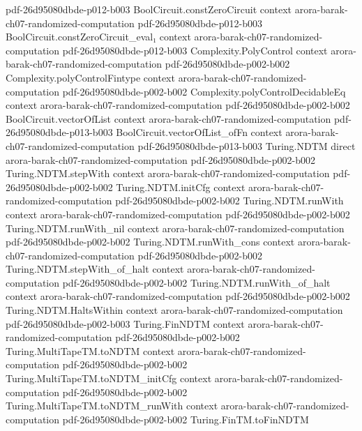 \begin{theorem}
  {pdf-26d95080dbde-p012-b003}
\proofstep
  {BoolCircuit.constZeroCircuit}
  {context}
  {arora-barak-ch07-randomized-computation}
  {pdf-26d95080dbde-p012-b003}
\proofstep
  {BoolCircuit.constZeroCircuit_eval₁}
  {context}
  {arora-barak-ch07-randomized-computation}
  {pdf-26d95080dbde-p012-b003}
\proofstep
  {Complexity.PolyControl}
  {context}
  {arora-barak-ch07-randomized-computation}
  {pdf-26d95080dbde-p002-b002}
\proofstep
  {Complexity.polyControlFintype}
  {context}
  {arora-barak-ch07-randomized-computation}
  {pdf-26d95080dbde-p002-b002}
\proofstep
  {Complexity.polyControlDecidableEq}
  {context}
  {arora-barak-ch07-randomized-computation}
  {pdf-26d95080dbde-p002-b002}
\proofstep
  {BoolCircuit.vectorOfList}
  {context}
  {arora-barak-ch07-randomized-computation}
  {pdf-26d95080dbde-p013-b003}
\proofstep
  {BoolCircuit.vectorOfList_ofFn}
  {context}
  {arora-barak-ch07-randomized-computation}
  {pdf-26d95080dbde-p013-b003}
\proofstep
  {Turing.NDTM}
  {direct}
  {arora-barak-ch07-randomized-computation}
  {pdf-26d95080dbde-p002-b002}
\proofstep
  {Turing.NDTM.stepWith}
  {context}
  {arora-barak-ch07-randomized-computation}
  {pdf-26d95080dbde-p002-b002}
\proofstep
  {Turing.NDTM.initCfg}
  {context}
  {arora-barak-ch07-randomized-computation}
  {pdf-26d95080dbde-p002-b002}
\proofstep
  {Turing.NDTM.runWith}
  {context}
  {arora-barak-ch07-randomized-computation}
  {pdf-26d95080dbde-p002-b002}
\proofstep
  {Turing.NDTM.runWith_nil}
  {context}
  {arora-barak-ch07-randomized-computation}
  {pdf-26d95080dbde-p002-b002}
\proofstep
  {Turing.NDTM.runWith_cons}
  {context}
  {arora-barak-ch07-randomized-computation}
  {pdf-26d95080dbde-p002-b002}
\proofstep
  {Turing.NDTM.stepWith_of_halt}
  {context}
  {arora-barak-ch07-randomized-computation}
  {pdf-26d95080dbde-p002-b002}
\proofstep
  {Turing.NDTM.runWith_of_halt}
  {context}
  {arora-barak-ch07-randomized-computation}
  {pdf-26d95080dbde-p002-b002}
\proofstep
  {Turing.NDTM.HaltsWithin}
  {context}
  {arora-barak-ch07-randomized-computation}
  {pdf-26d95080dbde-p002-b003}
\proofstep
  {Turing.FinNDTM}
  {context}
  {arora-barak-ch07-randomized-computation}
  {pdf-26d95080dbde-p002-b002}
\proofstep
  {Turing.MultiTapeTM.toNDTM}
  {context}
  {arora-barak-ch07-randomized-computation}
  {pdf-26d95080dbde-p002-b002}
\proofstep
  {Turing.MultiTapeTM.toNDTM_initCfg}
  {context}
  {arora-barak-ch07-randomized-computation}
  {pdf-26d95080dbde-p002-b002}
\proofstep
  {Turing.MultiTapeTM.toNDTM_runWith}
  {context}
  {arora-barak-ch07-randomized-computation}
  {pdf-26d95080dbde-p002-b002}
\proofstep
  {Turing.FinTM.toFinNDTM}

\end{theorem}
